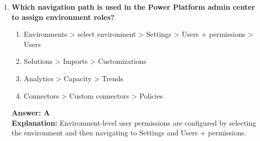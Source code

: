 \documentclass[10pt]{article}
\begin{document}
\begin{enumerate}[leftmargin=*]
\item \textbf{Which navigation path is used in the Power Platform admin center to assign environment roles?}
\begin{enumerate}[label=\Alph*.]
  \item Environments > select environment > Settings > Users + permissions > Users
  \item Solutions > Imports > Customizations
  \item Analytics > Capacity > Trends
  \item Connectors > Custom connectors > Policies
\end{enumerate}
\textbf{Answer: A}\\
\textbf{Explanation:} Environment-level user permissions are configured by selecting the environment and then navigating to Settings and Users + permissions.

\end{enumerate}

\clearpage
\end{document}
